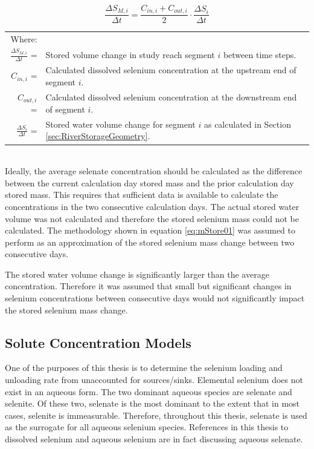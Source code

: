 \begin{linenumbers}
\begin{equation}
\frac{\Delta S_{M,i}}{\Delta t}=\frac{C_{in,i}+C_{out,i}}{2} \cdot \frac{\Delta S_i}{\Delta t}
\label{eq:mStore01}
\end{equation}
\begin{tabular}{r p{5.5in}}
	Where: \\
	$\displaystyle \frac{\Delta S_{M,i}}{\Delta t}$ = & Stored volume change in study reach segment $ i $ between time steps.\\
	$C_{in,i}$ =& Calculated dissolved selenium concentration at the upstream end of segment $ i $.\\
	$C_{out,i}$ =& Calculated dissolved selenium concentration at the downstream end of segment $ i $.\\
	$\displaystyle \frac{\Delta S_i}{\Delta t}$ =& Stored water volume change for segment $ i $ as calculated in Section \ref{sec:RiverStorageGeometry}.\\
\end{tabular}\\

Ideally, the average selenate concentration should be calculated as the difference between the current calculation day stored mass and the prior calculation day stored mass.  This requires that sufficient data is available to calculate the concentrations in the two consecutive calculation days.  The actual stored water volume was not calculated and therefore the stored selenium mass could not be calculated.  The methodology shown in equation \ref{eq:mStore01} was assumed to perform as an approximation of the stored selenium mass change between two consecutive days.

The stored water volume change is significantly larger than the average concentration.  Therefore it was assumed that small but significant changes in selenium concentrations between consecutive days would not significantly impact the stored selenium mass change.

\subsection{Solute Concentration Models}

One of the purposes of this thesis is to determine the selenium loading and unloading rate from unaccounted for sources/sinks.  Elemental selenium does not exist in an aqueous form.  The two dominant aqueous species are selenate and selenite.  Of these two, selenate is the most dominant to the extent that in most cases, selenite is immeasurable.  Therefore, throughout this thesis, selenate is used as the surrogate for all aqueous selenium species.  References in this thesis to dissolved selenium and aqueous selenium are in fact discussing aqueous selenate.  


\end{linenumbers}
